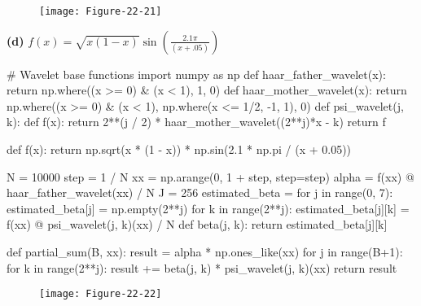 \begin{figure}[H]
\centering
\texttt{[image: Figure-22-21]}
\end{figure}

\textbf{(d)} $f(x) = \sqrt{x(1-x)} \sin \left(
\frac{2.1 \pi}{(x + .05)} \right) $

\begin{python}
# Wavelet base functions
import numpy as np
def haar_father_wavelet(x):
    return np.where((x >= 0) & (x < 1), 1, 0)
def haar_mother_wavelet(x):
    return np.where((x >= 0) & (x < 1), np.where(x <= 1/2, -1, 1), 0)
def psi_wavelet(j, k):
    def f(x):
        return 2**(j / 2) * haar_mother_wavelet((2**j)*x - k)
    return f
\end{python}

\begin{python}
def f(x):
    return np.sqrt(x * (1 - x)) * np.sin(2.1 * np.pi / (x + 0.05))
\end{python}

\begin{python}
N = 10000
step = 1 / N
xx = np.arange(0, 1 + step, step=step)
alpha = f(xx) @ haar_father_wavelet(xx) / N
J = 256
estimated_beta = {}
for j in range(0, 7):
    estimated_beta[j] = np.empty(2**j)
    for k in range(2**j):
        estimated_beta[j][k] = f(xx) @ psi_wavelet(j, k)(xx) / N
def beta(j, k):
    return estimated_beta[j][k]
\end{python}

\begin{python}
def partial_sum(B, xx):
    result = alpha * np.ones_like(xx)
    for j in range(B+1):
        for k in range(2**j):
            result += beta(j, k) * psi_wavelet(j, k)(xx)
    return result
\end{python}


\begin{figure}[H]
\centering
\texttt{[image: Figure-22-22]}
\end{figure}

